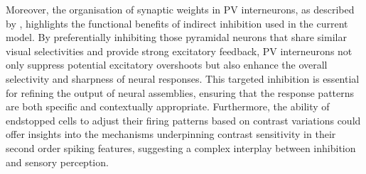\documentclass[12pt]{article}
\begin{document}
Moreover, the organisation of synaptic weights in PV interneurons, as described by \textcite{znamenskiyFunctionalSpecificityRecurrent2024}, highlights the functional benefits of indirect inhibition used in the current model. By preferentially inhibiting those pyramidal neurons that share similar visual selectivities and provide strong excitatory feedback, PV interneurons not only suppress potential excitatory overshoots but also enhance the overall selectivity and sharpness of neural responses. This targeted inhibition is essential for refining the output of neural assemblies, ensuring that the response patterns are both specific and contextually appropriate. Furthermore, the ability of endstopped cells to adjust their firing patterns based on contrast variations could offer insights into the mechanisms underpinning contrast sensitivity in their second order spiking features, suggesting a complex interplay between inhibition and sensory perception.

\end{document}
